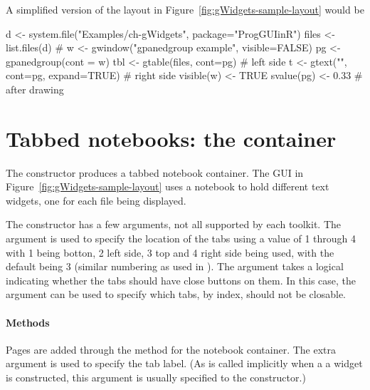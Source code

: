 A simplified version of the layout in
Figure~\ref{fig:gWidgets-sample-layout} would be
\begin{Schunk}
\begin{Sinput}
 d <- system.file("Examples/ch-gWidgets", package="ProgGUIinR")
 files <- list.files(d)
 #
 w <- gwindow("gpanedgroup example", visible=FALSE)
 pg <- gpanedgroup(cont = w)
 tbl <- gtable(files, cont=pg)           # left side
 t <- gtext("", cont=pg, expand=TRUE)    # right side
 visible(w) <- TRUE
 svalue(pg) <- 0.33                      # after drawing
\end{Sinput}
\end{Schunk}




  
\section{Tabbed notebooks: the  container}
\label{sec:gWidgets-gnotebook}

The  constructor produces a tabbed notebook
container. The GUI in Figure~\ref{fig:gWidgets-sample-layout} uses a
notebook to hold different text widgets, one for each file being displayed.

The  constructor has a few arguments, not all supported
by each toolkit. The
argument  is used to specify the location
of the tabs using a value of 1 through 4 with 1 being botton, 2 left
side, 3 top and 4 right side being used, with the default being 3
(similar numbering as used in ). The
 argument takes a logical indicating
whether the tabs should have close buttons on them. In this case, the
argument  can be used to specify
which tabs, by index, should not be closable.



\paragraph{Methods}
Pages are added through the  method for the
notebook container. The extra   argument is used
to specify the tab label. (As  is called implicitly when a a
widget is constructed, this argument is usually specified to the
constructor.)



